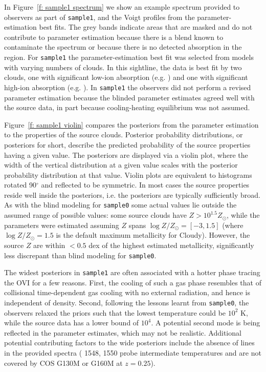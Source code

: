 \documentclass[fleqn,usenatbib]{mnras}
\begin{document}
In Figure~\ref{f: sample1 spectrum} we show an example spectrum provided to observers as part of \texttt{sample1}, and the Voigt profiles from the parameter-estimation best fits.
The grey bands indicate areas that are masked and do not contribute to parameter estimation because there is a blend known to contaminate the spectrum or because there is no detected absorption in the region.
For \texttt{sample1} the parameter-estimation best fit was selected from models with varying numbers of clouds.
In this sightline, the data is best fit by two clouds, one with significant low-ion absorption (e.g. )  and one with significant high-ion absorption (e.g. ).
In \texttt{sample1} the observers did not perform a revised parameter estimation because the blinded parameter estimates agreed well with the source data, in part because cooling-heating equilibrium was not assumed.

Figure~\ref{f: sample1 violin} compares the posteriors from the parameter estimation to the properties of the source clouds.
Posterior probability distributions, or posteriors for short, describe the predicted probability of the source properties having a given value.
The posteriors are displayed via a violin plot,
where the width of the vertical distribution at a given value scales with the posterior probability distribution at that value.
Violin plots are equivalent to histograms rotated 90$^\circ$ and reflected to be symmetric.
In most cases the source properties reside well inside the posteriors, i.e. the posteriors are typically sufficiently broad.
As with the blind modeling for \texttt{sample0} some actual values lie outside the assumed range of possible values: 
some source clouds have $Z > 10^{1.5} Z_\odot$, while the parameters were estimated assuming $Z$ spans $\log Z/Z_\odot = [-3, 1.5]$ (where $\log Z/Z_\odot = 1.5$ is the default maximum metallicity for Cloudy).
However, the source $Z$ are within $< 0.5$ dex of the highest estimated metallicity, significantly less discrepant than blind modeling for \texttt{sample0}.

The widest posteriors in \texttt{sample1} are often associated with a hotter phase tracing the OVI for a few reasons.
First, the cooling of such a gas phase resembles that of collisional time-dependent gas cooling with no external radiation, and hence is independent of density.
Second, following the lessons learnt from \texttt{sample0}, the observers relaxed the priors such that the lowest temperature could be $10^2$ K, while the source data has a lower bound of $10^4$.
A potential second mode is being reflected in the parameter estimates, which may not be realistic. 
Additional potential contributing factors to the wide posteriors include the absence of  lines in the provided spectra ( 1548, 1550 probe intermediate temperatures and are not covered by COS G130M or G160M at $z=0.25$).
\end{document}
